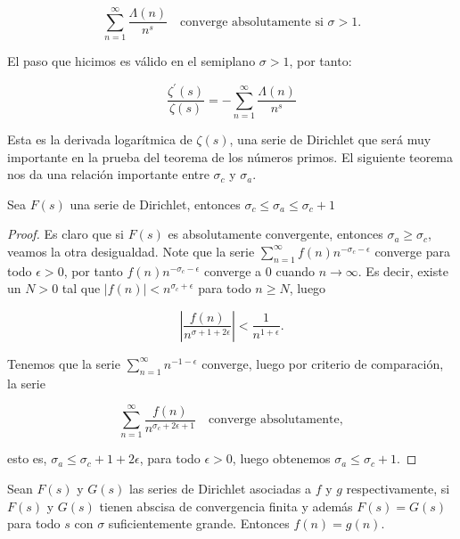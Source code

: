 $$\sum_{n=1}^{\infty} \frac{\Lambda(n)}{n^s}\quad \text{converge absolutamente si } \sigma>1.$$

El paso que hicimos es válido en el semiplano $\sigma>1$, por tanto:

$$\frac{\zeta^{\prime}(s)}{\zeta(s)}=-\sum_{n=1}^{\infty} \frac{\Lambda(n)}{n^s}$$

Esta es la derivada logarítmica de $\zeta(s)$, una serie de Dirichlet que será muy importante en la prueba del teorema de los números primos. El siguiente teorema nos da una relación importante entre $\sigma_c$ y $\sigma_a$.

\begin{theorem}
Sea $F(s)$ una serie de Dirichlet, entonces $\sigma_c\leq\sigma_a\leq \sigma_c+1$
\end{theorem}

\begin{proof}
Es claro que si $F(s)$ es absolutamente convergente, entonces $\sigma_a\geq \sigma_c$, veamos la otra desigualdad. Note que la serie $\displaystyle \sum_{n=1}^{\infty} f(n)n^{-\sigma_c-\epsilon}$ converge para todo $\epsilon>0$, por tanto $f(n)n^{-\sigma_c-\epsilon}$ converge a 0 cuando $n\to \infty$. Es decir, existe un $N>0$ tal que $|f(n)|<n^{\sigma_c+\epsilon}$ para todo $n\geq N$, luego

$$\left|\frac{f(n)}{n^{\sigma+1+2\epsilon}}\right|<\frac{1}{n^{1+\epsilon}}.$$

Tenemos que la serie $\displaystyle \sum_{n=1}^{\infty} n^{-1-\epsilon}$ converge, luego por criterio de comparación, la serie

$$\sum_{n=1}^{\infty} \frac{f(n)}{n^{\sigma_c+2\epsilon+1}} \quad\text{converge absolutamente},$$

esto es, $\sigma_a\leq \sigma_c+1+2\epsilon$, para todo $\epsilon>0$, luego obtenemos $\sigma_a\leq \sigma_c+1$.
\end{proof}

\begin{theorem}[Unicidad]

Sean $F(s)$ y $G(s)$ las series de Dirichlet asociadas a $f$ y $g$ respectivamente, si $F(s)$ y $G(s)$ tienen abscisa de convergencia finita y además $F(s)=G(s)$ para  todo $s$ con $\sigma$ suficientemente grande. Entonces $f(n)=g(n)$.
\end{theorem}

